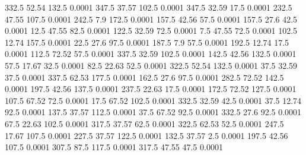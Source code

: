 332.5	52.54	132.5	0.0001
347.5	37.57	102.5	0.0001
347.5	32.59	17.5	0.0001
232.5	47.55	107.5	0.0001
242.5	7.9	172.5	0.0001
157.5	42.56	57.5	0.0001
157.5	27.6	42.5	0.0001
12.5	47.55	82.5	0.0001
122.5	32.59	72.5	0.0001
7.5	47.55	72.5	0.0001
102.5	12.74	157.5	0.0001
22.5	27.6	97.5	0.0001
187.5	7.9	57.5	0.0001
192.5	12.74	17.5	0.0001
112.5	72.52	57.5	0.0001
337.5	32.59	102.5	0.0001
142.5	42.56	132.5	0.0001
57.5	17.67	32.5	0.0001
82.5	22.63	52.5	0.0001
322.5	52.54	132.5	0.0001
37.5	32.59	37.5	0.0001
337.5	62.53	177.5	0.0001
162.5	27.6	97.5	0.0001
282.5	72.52	142.5	0.0001
197.5	42.56	137.5	0.0001
237.5	22.63	17.5	0.0001
172.5	72.52	127.5	0.0001
107.5	67.52	72.5	0.0001
17.5	67.52	102.5	0.0001
332.5	32.59	42.5	0.0001
37.5	12.74	92.5	0.0001
137.5	37.57	112.5	0.0001
37.5	67.52	92.5	0.0001
332.5	27.6	92.5	0.0001
67.5	22.63	102.5	0.0001
317.5	37.57	62.5	0.0001
322.5	62.53	52.5	0.0001
247.5	17.67	107.5	0.0001
227.5	37.57	122.5	0.0001
132.5	37.57	2.5	0.0001
197.5	42.56	107.5	0.0001
307.5	87.5	117.5	0.0001
317.5	47.55	47.5	0.0001
